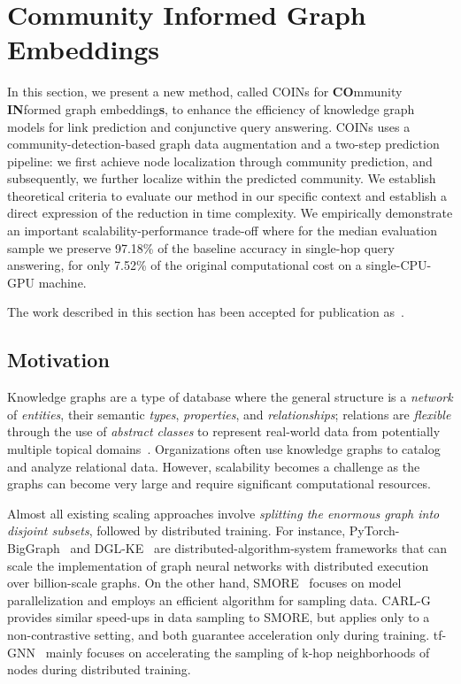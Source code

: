 \section{Community Informed Graph Embeddings}
\label{sec: coins}

In this section, we present a new method, called COINs for \textbf{CO}mmunity \textbf{IN}formed graph embedding\textbf{s}, to enhance the efficiency of knowledge graph models for link prediction and conjunctive query answering. COINs uses a community-detection-based graph data augmentation and a two-step prediction pipeline: we first achieve node localization through community prediction, and subsequently, we further localize within the predicted community. We establish theoretical criteria to evaluate our method in our specific context and establish a direct expression of the reduction in time complexity. We empirically demonstrate an important scalability-performance trade-off where for the median evaluation sample we preserve 97.18\% of the baseline accuracy in single-hop query answering, for only 7.52\% of the original computational cost on a single-CPU-GPU machine. 

The work described in this section has been accepted for publication as~\cite{janchevski_coins_2025}.

\subsection{Motivation}
Knowledge graphs are a type of database where the general structure is a \emph{network} of \emph{entities}, their semantic \emph{types}, \emph{properties}, and \emph{relationships}; relations are \emph{flexible} through the use of \emph{abstract classes} to represent real-world data from potentially multiple topical domains~\cite{ehrlinger_towards_2016,hogan_knowledge_2020}. Organizations often use knowledge graphs to catalog and analyze relational data. However, scalability becomes a challenge as the graphs can become very large and require significant computational resources.

Almost all existing scaling approaches involve \emph{splitting the enormous graph into disjoint subsets}, followed by distributed training.
For instance, PyTorch-BigGraph~\cite{lerer_pytorch-biggraph_2019} and DGL-KE~\cite{zheng_dgl-ke_2020} are distributed-algorithm-system frameworks that can scale the implementation of graph neural networks with distributed execution over billion-scale graphs.
On the other hand, SMORE~\cite{ren_smore_2021} focuses on model parallelization and employs an efficient algorithm for sampling data. CARL-G~\cite{shiao_carl-g_2023} provides similar speed-ups in data sampling to SMORE, but applies only to a non-contrastive setting, and both guarantee acceleration only during training. tf-GNN~\cite{ferludin_tf-gnn_2022} mainly focuses on accelerating the sampling of k-hop neighborhoods of nodes during distributed training.

